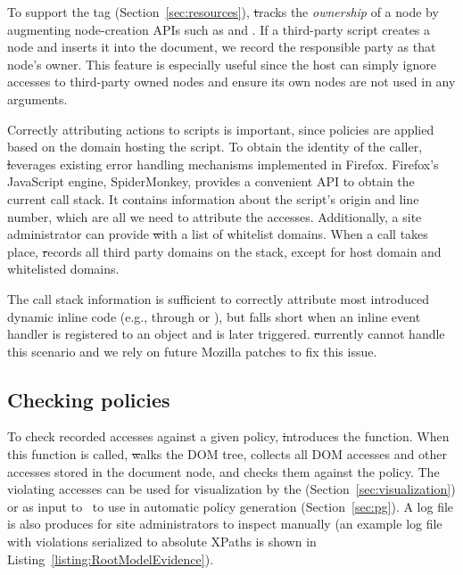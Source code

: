 To support the \code{[o]} tag (Section~\ref{sec:resources}),
\st tracks the \emph{ownership} of a node by augmenting node-creation
APIs such as  and .  If a
third-party script creates a node and inserts it into the document, we
record the responsible party as that node's owner.  This feature is especially useful since the host can simply ignore
accesses to third-party owned nodes and ensure its own nodes are not used in any arguments.

\label{sec:attribution}
Correctly attributing actions to scripts is important, since policies
are applied based on the domain hosting the script.  To obtain the
identity of the caller, \st leverages existing error handling mechanisms
implemented in Firefox.  Firefox's JavaScript engine, SpiderMonkey,
provides a convenient API to obtain the current call stack.  It contains information about the script's origin and line
number, which are all we need to attribute the accesses.  Additionally, a site administrator can provide \st with a list of whitelist domains.  When a call takes place, \st records all third party domains on the stack, except for host domain and whitelisted domains.

The call stack information is sufficient to correctly attribute most
introduced dynamic inline code (e.g., through  or ), but falls short when
an inline event handler is registered to an object and is later
triggered.  \st currently cannot handle this scenario and we rely on
future Mozilla patches to fix this issue.

\subsection{Checking policies}\label{sec:checkingPolicy}

To check recorded accesses against a given policy, \st introduces the  function.  When this function is called, \st walks the DOM tree, collects all DOM accesses and other accesses stored in the document node, and checks them against the policy.  The violating accesses can be used for visualization by the \vis (Section~\ref{sec:visualization}) or as input to \pg\ to use in automatic policy generation (Section~\ref{sec:pg}).  A log file is also produces for site administrators to inspect manually (an example log file with violations serialized to absolute XPaths is shown in Listing~\ref{listing:RootModelEvidence}).  

